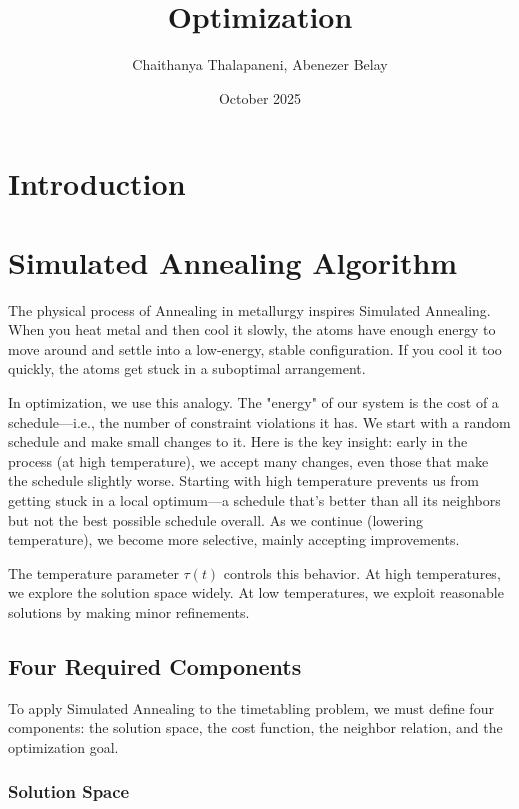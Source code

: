 \documentclass{article}
\title{Optimization}
\author{Chaithanya Thalapaneni, Abenezer Belay}
\date{October 2025}
\begin{document}
\maketitle

\section{Introduction}

\section{Simulated Annealing Algorithm}

The physical process of Annealing in metallurgy inspires Simulated Annealing. When you heat metal and then cool it slowly, the atoms have enough energy to move around and settle into a low-energy, stable configuration. If you cool it too quickly, the atoms get stuck in a suboptimal arrangement.

In optimization, we use this analogy. The "energy" of our system is the cost of a schedule—i.e., the number of constraint violations it has. We start with a random schedule and make small changes to it. Here is the key insight: early in the process (at high temperature), we accept many changes, even those that make the schedule slightly worse. Starting with high temperature prevents us from getting stuck in a local optimum—a schedule that's better than all its neighbors but not the best possible schedule overall. As we continue (lowering temperature), we become more selective, mainly accepting improvements.

The temperature parameter $\tau(t)$ controls this behavior. At high temperatures, we explore the solution space widely. At low temperatures, we exploit reasonable solutions by making minor refinements.

\subsection{Four Required Components}

To apply Simulated Annealing to the timetabling problem, we must define four components: the solution space, the cost function, the neighbor relation, and the optimization goal.

\subsubsection{Solution Space}
\end{document}
